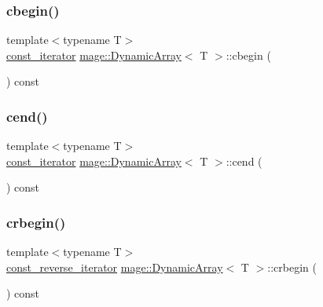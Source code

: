 \mbox{\label{classmage_1_1_dynamic_array_aee29dc1214ffb38086266690c09fca24}} 
\subsubsection{\texorpdfstring{cbegin()}{cbegin()}}
{\footnotesize\ttfamily template$<$typename T$>$ \\
\mbox{\hyperlink{classmage_1_1_dynamic_array_ad27aa1273eb102bbd596a13a00159001}{const\+\_\+iterator}} \mbox{\hyperlink{classmage_1_1_dynamic_array}{mage\+::\+Dynamic\+Array}}$<$ T $>$\+::cbegin (\begin{DoxyParamCaption}{ }\end{DoxyParamCaption}) const\hspace{0.3cm}{\ttfamily [noexcept]}}

\mbox{\label{classmage_1_1_dynamic_array_a637a521283585da3797c9c78b767b87c}} 
\subsubsection{\texorpdfstring{cend()}{cend()}}
{\footnotesize\ttfamily template$<$typename T$>$ \\
\mbox{\hyperlink{classmage_1_1_dynamic_array_ad27aa1273eb102bbd596a13a00159001}{const\+\_\+iterator}} \mbox{\hyperlink{classmage_1_1_dynamic_array}{mage\+::\+Dynamic\+Array}}$<$ T $>$\+::cend (\begin{DoxyParamCaption}{ }\end{DoxyParamCaption}) const\hspace{0.3cm}{\ttfamily [noexcept]}}

\mbox{\label{classmage_1_1_dynamic_array_a3aa7838e2609077168916c38295f37e3}} 
\subsubsection{\texorpdfstring{crbegin()}{crbegin()}}
{\footnotesize\ttfamily template$<$typename T$>$ \\
\mbox{\hyperlink{classmage_1_1_dynamic_array_afbcc530c2cd68cc3b0474a4b1a5c6a15}{const\+\_\+reverse\+\_\+iterator}} \mbox{\hyperlink{classmage_1_1_dynamic_array}{mage\+::\+Dynamic\+Array}}$<$ T $>$\+::crbegin (\begin{DoxyParamCaption}{ }\end{DoxyParamCaption}) const\hspace{0.3cm}{\ttfamily [noexcept]}}

